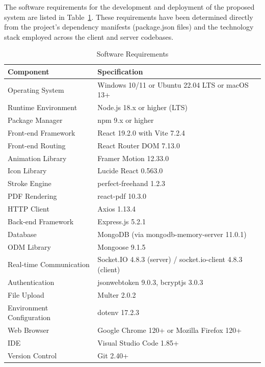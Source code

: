 \documentclass[12pt,a4paper]{report}
\begin{document}
The software requirements for the development and deployment of the proposed system are listed in Table~\ref{tab:3.1}. These requirements have been determined directly from the project's dependency manifests (package.json files) and the technology stack employed across the client and server codebases.

\begin{table}[htbp]
  \caption{Software Requirements}
  \label{tab:3.1}
  \centering
  \begin{tabular}{@{} l l @{}}
    \toprule
    \textbf{Component}            & \textbf{Specification} \\
    \midrule
    Operating System              & Windows 10/11 or Ubuntu 22.04 LTS or macOS 13+ \\
    Runtime Environment           & Node.js 18.x or higher (LTS) \\
    Package Manager               & npm 9.x or higher \\
    Front-end Framework           & React 19.2.0 with Vite 7.2.4 \\
    Front-end Routing             & React Router DOM 7.13.0 \\
    Animation Library             & Framer Motion 12.33.0 \\
    Icon Library                  & Lucide React 0.563.0 \\
    Stroke Engine                 & perfect-freehand 1.2.3 \\
    PDF Rendering                 & react-pdf 10.3.0 \\
    HTTP Client                   & Axios 1.13.4 \\
    Back-end Framework            & Express.js 5.2.1 \\
    Database                      & MongoDB (via mongodb-memory-server 11.0.1) \\
    ODM Library                   & Mongoose 9.1.5 \\
    Real-time Communication       & Socket.IO 4.8.3 (server) / socket.io-client 4.8.3 (client) \\
    Authentication                & jsonwebtoken 9.0.3, bcryptjs 3.0.3 \\
    File Upload                   & Multer 2.0.2 \\
    Environment Configuration     & dotenv 17.2.3 \\
    Web Browser                   & Google Chrome 120+ or Mozilla Firefox 120+ \\
    IDE                           & Visual Studio Code 1.85+ \\
    Version Control               & Git 2.40+ \\
    \bottomrule
  \end{tabular}
\end{table}
\end{document}
